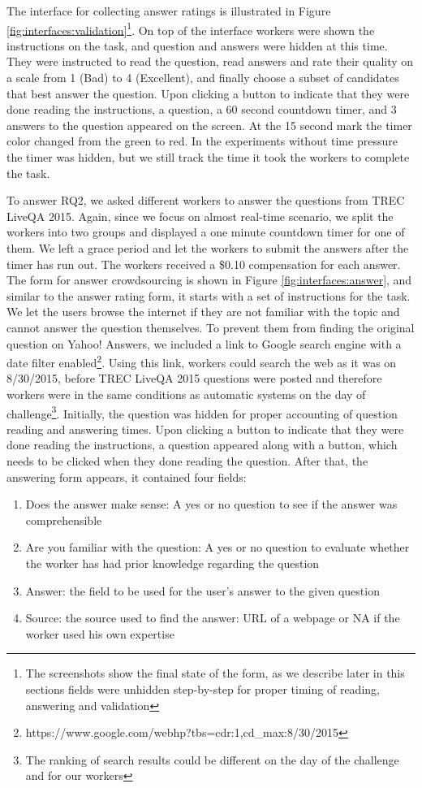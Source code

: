 \documentclass[11pt,letterpaper]{article}
\begin{document}
The interface for collecting answer ratings is illustrated in Figure \ref{fig:interfaces:validation}\footnote{The screenshots show the final state of the form, as we describe later in this sections fields were unhidden step-by-step for proper timing of reading, answering and validation}.
On top of the interface workers were shown the instructions on the task, and question and answers were hidden at this time.
They were instructed to read the question, read answers and rate their quality on a scale from 1 (Bad) to 4 (Excellent), and finally choose a subset of candidates that best answer the question.
Upon clicking a button to indicate that they were done reading the instructions, a question, a 60 second countdown timer, and 3 answers to the question appeared on the screen.
At the 15 second mark the timer color changed from the green to red.
In the experiments without time pressure the timer was hidden, but we still track the time it took the workers to complete the task.

To answer RQ2, we asked different workers to answer the questions from TREC LiveQA 2015.
Again, since we focus on almost real-time scenario, we split the workers into two groups and displayed a one minute countdown timer for one of them.
We left a grace period and let the workers to submit the answers after the timer has run out.
The workers received a \$0.10 compensation for each answer.
The form for answer crowdsourcing is shown in Figure \ref{fig:interfaces:answer}, and similar to the answer rating form, it starts with a set of instructions for the task.
We let the users browse the internet if they are not familiar with the topic and cannot answer the question themselves.
To prevent them from finding the original question on Yahoo! Answers, we included a link to Google search engine with a date filter enabled\footnote{https://www.google.com/webhp?tbs=cdr:1,cd\_max:8/30/2015}.
Using this link, workers could search the web as it was on 8/30/2015, before TREC LiveQA 2015 questions were posted and therefore workers were in the same conditions as automatic systems on the day of challenge\footnote{The ranking of search results could be different on the day of the challenge and for our workers}.
Initially, the question was hidden for proper accounting of question reading and answering times.
Upon clicking a button to indicate that they were done reading the instructions, a question appeared along with a button, which needs to be clicked when they done reading the question.
After that, the answering form appears, it contained four fields:
\begin{enumerate}
\item Does the answer make sense: A yes or no question to see if the answer was comprehensible 
\item Are you familiar with the question: A yes or no question to evaluate whether the worker has had prior knowledge regarding the question
\item Answer: the field to be used for the user's answer to the given question
\item Source: the source used to find the answer: URL of a webpage or NA if the worker used his own expertise
\end{enumerate}
\end{document}
